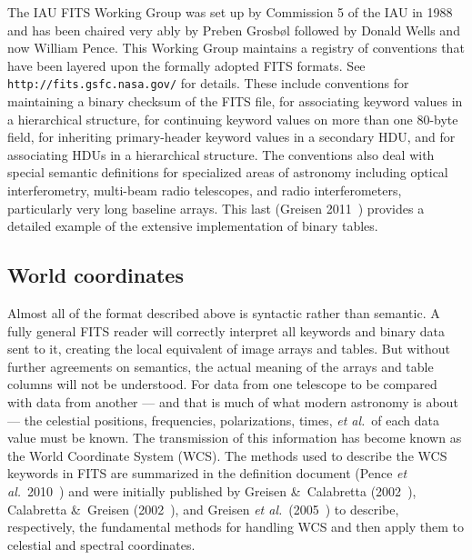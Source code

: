 \documentclass[twoside]{article}
\newcommand{\etal}{{\it et al.}}
\newcommand{\keyw}[1]{\hbox{{\tt #1}}}
\begin{document}
The IAU FITS Working Group was set up by Commission 5 of the IAU in
1988 and has been chaired very ably by Preben Grosb\o l followed by
Donald Wells and now William Pence.  This Working Group maintains a
registry of conventions that have been layered upon the formally
adopted FITS formats.  See \keyw{http://fits.gsfc.nasa.gov/} for
details.  These include conventions for maintaining a binary checksum
of the FITS file, for associating keyword values in a hierarchical
structure, for continuing keyword values on more than one 80-byte
field, for inheriting primary-header keyword values in a secondary
HDU, and for associating HDUs in a hierarchical structure.  The
conventions also deal with special semantic definitions for
specialized areas of astronomy including optical interferometry,
multi-beam radio telescopes, and radio interferometers, particularly
very long baseline arrays.  This last (Greisen 2011~\cite{G11})
provides a detailed example of the extensive implementation of binary
tables.

\subsection{World coordinates}

Almost all of the format described above is syntactic rather than
semantic.  A fully general FITS reader will correctly interpret all
keywords and binary data sent to it, creating the local equivalent of
image arrays and tables.  But without further agreements on semantics,
the actual meaning of the arrays and table columns will not be
understood.  For data from one telescope to be compared with data from
another --- and that is much of what modern astronomy is about --- the
celestial positions, frequencies, polarizations, times, \etal~of each
data value must be known.  The transmission of this information has
become known as the World Coordinate System (WCS).  The methods used
to describe the WCS keywords in FITS are summarized in the definition
document (Pence \etal~2010~\cite{PCPSS10}) and were initially
published by Greisen \&\ Calabretta (2002~\cite{GC02}), Calabretta \&\
Greisen (2002~\cite{CG02}), and Greisen \etal~(2005~\cite{GCVA05}) to
describe, respectively, the fundamental methods for handling WCS and
then apply them to celestial and spectral coordinates.
\end{document}
